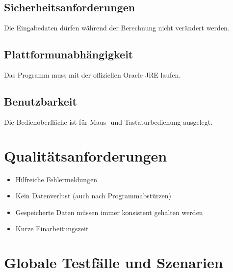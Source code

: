 \documentclass[10pt,a4paper]{article}
\begin{document}
\subsection{Sicherheitsanforderungen}
Die Eingabedaten dürfen während der Berechnung nicht verändert werden.

\subsection{Plattformunabhängigkeit}
Das Programm muss mit der offiziellen Oracle JRE laufen.

\subsection{Benutzbarkeit}
Die Bedienoberfläche ist für Maus- und Tastaturbedienung ausgelegt.

\section{Qualitätsanforderungen}
\begin{itemize}
	\item Hilfreiche Fehlermeldungen
	\item Kein Datenverlust (auch nach Programmabstürzen)
	\item Gespeicherte Daten müssen immer konsistent gehalten werden
	\item Kurze Einarbeitungszeit
\end{itemize}
\newpage
\section{Globale Testfälle und Szenarien}
\end{document}

